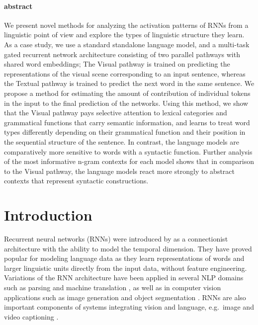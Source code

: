 \paragraph{abstract}
  We present novel methods for analyzing the activation patterns of
  RNNs from a linguistic point of view and explore the types of
  linguistic structure they learn. As a case study, we use a standard
  standalone language model, and a multi-task gated
  recurrent network architecture consisting of two parallel pathways with
  shared word embeddings; The {\sc Visual} pathway is trained on predicting the
  representations of the visual scene corresponding to an input
  sentence, whereas the {\sc Textual} pathway is trained to predict the
  next word in the same sentence.
  We propose a method for estimating the amount of contribution
  of individual tokens in the input to the final prediction of the networks.
  Using this method, we show that the {\sc Visual} pathway pays
  selective attention to lexical categories and grammatical functions
  that carry semantic information, and learns to treat word types
  differently depending on their grammatical function and their position
  in the sequential structure of the sentence. In contrast, the language
  models are comparatively more sensitive to words with a syntactic
  function. Further analysis of the most informative n-gram contexts for
  each model shows that in comparison to the {\sc Visual} pathway,
  the language models react more strongly to abstract contexts
  that represent syntactic constructions.


\section{Introduction}
\label{sec:intro}
Recurrent neural networks (RNNs) were introduced by
\citep{elman1990finding}
as a connectionist architecture with the
ability to model the temporal dimension. They have proved popular for
modeling language data as they learn representations of words and
larger linguistic units directly from the input data, without feature
engineering. Variations of the RNN architecture have been applied in
several NLP domains such as parsing \cite{vinyals2015grammar} and
machine translation \cite{bahdanau2014neural}, as well as in computer
vision applications such as image generation \cite{gregor2015draw} and
object segmentation \cite{visin2015reseg}. RNNs are also important
components of systems integrating vision and language, e.g.\ image
\cite{karpathy2015deep} and video captioning \cite{yu2015video}.

